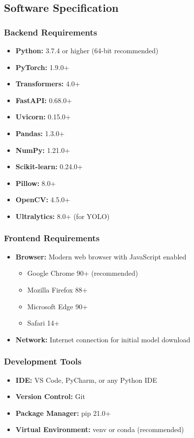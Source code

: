 \documentclass[12pt,a4paper]{report}
\begin{document}
\subsection{Software Specification}

\subsubsection{Backend Requirements}
\begin{itemize}
    \item \textbf{Python:} 3.7.4 or higher (64-bit recommended)
    \item \textbf{PyTorch:} 1.9.0+
    \item \textbf{Transformers:} 4.0+
    \item \textbf{FastAPI:} 0.68.0+
    \item \textbf{Uvicorn:} 0.15.0+
    \item \textbf{Pandas:} 1.3.0+
    \item \textbf{NumPy:} 1.21.0+
    \item \textbf{Scikit-learn:} 0.24.0+
    \item \textbf{Pillow:} 8.0+
    \item \textbf{OpenCV:} 4.5.0+
    \item \textbf{Ultralytics:} 8.0+ (for YOLO)
\end{itemize}

\subsubsection{Frontend Requirements}
\begin{itemize}
    \item \textbf{Browser:} Modern web browser with JavaScript enabled
    \begin{itemize}
        \item Google Chrome 90+ (recommended)
        \item Mozilla Firefox 88+
        \item Microsoft Edge 90+
        \item Safari 14+
    \end{itemize}
    \item \textbf{Network:} Internet connection for initial model download
\end{itemize}

\subsubsection{Development Tools}
\begin{itemize}
    \item \textbf{IDE:} VS Code, PyCharm, or any Python IDE
    \item \textbf{Version Control:} Git
    \item \textbf{Package Manager:} pip 21.0+
    \item \textbf{Virtual Environment:} venv or conda (recommended)
\end{itemize}
\end{document}
